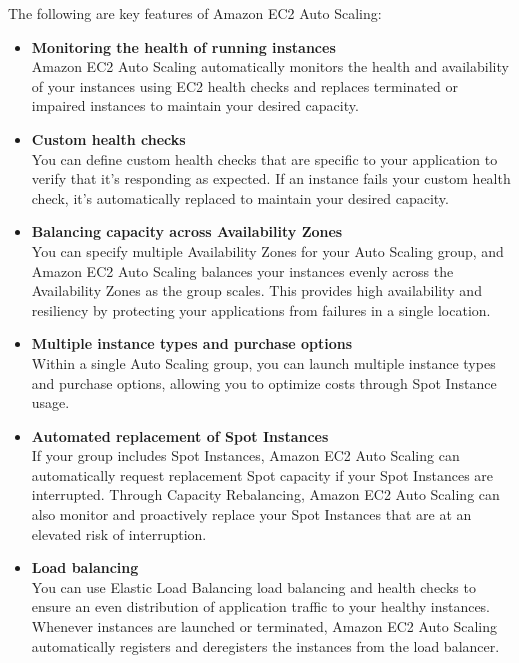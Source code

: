 \documentclass[12pt, letterpaper, twoside]{article}
\begin{document}
The following are key features of Amazon EC2 Auto Scaling:
\begin{itemize}
	\item \textbf{Monitoring the health of running instances}\\
	Amazon EC2 Auto Scaling automatically monitors the health and availability of your instances using EC2 health 
		checks and replaces terminated or impaired instances to maintain your desired capacity.
	
	\item \textbf{Custom health checks}\\
	You can define custom health checks that are specific to your application to verify that it's responding as 
	expected. If an instance fails your custom health check, it's automatically replaced to maintain your 
	desired capacity.
	
	\item \textbf{Balancing capacity across Availability Zones}\\
	You can specify multiple Availability Zones for your Auto Scaling group, and Amazon EC2 Auto Scaling balances 
		your instances evenly across the Availability Zones as the group scales. This provides high availability 
		and resiliency by protecting your applications from failures in a single location.

	\item \textbf{Multiple instance types and purchase options}\\
	Within a single Auto Scaling group, you can launch multiple instance types and purchase options, allowing you 
	to optimize costs through Spot Instance usage.

	\item \textbf{Automated replacement of Spot Instances}\\
	If your group includes Spot Instances, Amazon EC2 Auto Scaling can automatically request replacement Spot capacity 
	if your Spot Instances are interrupted. Through Capacity Rebalancing, Amazon EC2 Auto Scaling can also monitor 
	and proactively replace your Spot Instances that are at an elevated risk of interruption.

	\item \textbf{Load balancing}\\
	You can use Elastic Load Balancing load balancing and health checks to ensure an even distribution of application 
	traffic to your healthy instances. Whenever instances are launched or terminated, Amazon EC2 Auto Scaling automatically 
	registers and deregisters the instances from the load balancer.


\end{itemize}
\end{document}
